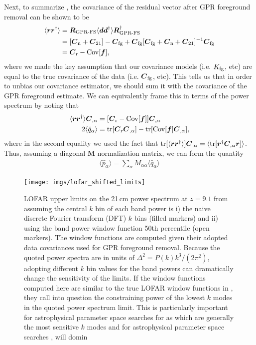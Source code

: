 \documentclass[a4paper,fleqn,usenatbib]{mnras}
\def\d{\boldsymbol{d}}
\def\f{\boldsymbol{f}}
\def\r{\boldsymbol{r}}
\def\R{\boldsymbol{R}}
\def\M{\boldsymbol{M}}
\def\C{\boldsymbol{C}}
\def\Cfg{\boldsymbol{C}_{\rm fg}}
\def\Cto{\boldsymbol{C}_{\rm 21}}
\def\Cn{\boldsymbol{C}_{\rm n}}
\def\Cov{{\rm Cov}}
\def\Kfg{K_{\rm fg}}
\def\tr{{\rm tr}}
\begin{document}
Next, to summarize , the covariance of the residual vector after GPR foreground removal can be shown to be
\begin{align}
\label{eq:res_covariance}
\langle\r\r^\dagger\rangle &= \R_{\operatorname{GPR-FS}}\langle\d\d^\dagger\rangle\R_{\operatorname{GPR-FS}}^\dagger \nonumber \\
&= [\Cn + \Cto] - \Cfg + \Cfg[\Cfg + \Cn + \Cto]^{-1}\Cfg \nonumber \\
&= \C_{\rm r} - \Cov[\f],
\end{align}
where we made the key assumption that our covariance models (i.e. $\Kfg$, etc) are equal to the true covariance of the data (i.e. $\Cfg$, etc).
This tells us that in order to unbias our covariance estimator, we should sum it with the covariance of the GPR foreground estimate.
We can equivalently frame this in terms of the power spectrum by noting that
\begin{align}
\langle\r\r^\dagger\rangle\C_{,\alpha} &= [\C_{\rm r} - \Cov[\f]]\C_{,\alpha} \nonumber \\
2\langle\hat{q}_\alpha\rangle &= \tr[\C_{\rm r}\C_{,\alpha}] - \tr[\Cov[\f]\C_{,\alpha}],
\end{align}
where in the second equality we used the fact that $\tr[\langle\r\r^\dagger\rangle]\C_{,\alpha} = \langle\tr[\r^\dagger\C_{,\alpha}\r]\rangle$.
Thus, assuming a diagonal $\M$ normalization matrix, we can form the quantity
\begin{align}
\langle\hat{p}_\alpha\rangle = \sum_\alpha M_{\alpha\alpha}\langle\hat{q}_\alpha\rangle
\end{align}



\begin{figure}
\centering
\texttt{[image: imgs/lofar\_shifted\_limits]}
\caption{LOFAR upper limits on the 21\,cm power spectrum at $z=9.1$ from  assuming the central $k$ bin of each band power is i) the naive discrete Fourier transform (DFT) $k$ bins (filled markers) and ii) using the band power window function 50th percentile (open markers).
The window functions are computed given their adopted data covariances used for GPR foreground removal.
Because the quoted power spectra are in units of $\Delta^2 = P(k) k^3/(2\pi^2)$, adopting different $k$ bin values for the band powers can dramatically change the sensitivity of the limits.
If the window functions computed here are similar to the true LOFAR window functions in , they call into question the constraining power of the lowest $k$ modes in the quoted power spectrum limit.
This is particularly important for astrophysical parameter space searches for as which are generally the most sensitive $k$ modes and for astrophysical parameter space searches \citep{Ghara2020}, will domin
}
\label{fig:lofar_shifted_limits}
\end{figure}
\end{document}
